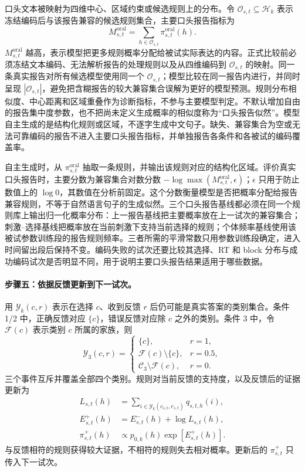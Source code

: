 口头文本被映射为四维中心、区域约束或候选规则上的分布。令 $\mathcal O_{s,t}\subseteq\mathcal H_k$ 表示冻结编码后与该报告兼容的候选规则集合，主要口头报告指标为
\begin{equation}
    M^{\mathrm{oral}}_{s,t}
    =\sum_{h\in\mathcal O_{s,t}}\pi^{\mathrm{oral}}_{s,t}(h).
    \label{eq:newplan-oral-mass}
\end{equation}
$M^{\mathrm{oral}}_{s,t}$ 越高，表示模型把更多规则概率分配给被试实际表达的内容。正式比较前必须冻结文本编码、无法解析报告的处理规则以及从四维编码到 $\mathcal O_{s,t}$ 的映射。同一条真实报告对所有候选模型使用同一个 $\mathcal O_{s,t}$；模型比较在同一报告内进行，并同时呈现 $|\mathcal O_{s,t}|$，避免把含糊报告的较大兼容集合误解为更好的模型预测。规则分布相似度、中心距离和区域重叠作为诊断指标，不参与主要模型判定。不默认增加自由的报告集中度参数，也不把尚未定义生成概率的相似度称为“口头报告似然”。模型自主生成的是结构化规则或区域，不逐字生成中文句子。缺失、兼容集合为空或无法可靠编码的报告不进入主要口头报告指标，并单独报告各条件和各被试的编码覆盖率。

自主生成时，从 $\pi^{\mathrm{oral}}_{s,t}$ 抽取一条规则，并输出该规则对应的结构化区域。评价真实口头报告时，主要分数为兼容集合对数分数 $-\log\max(M^{\mathrm{oral}}_{s,t},\epsilon)$；$\epsilon$ 只用于防止数值上的 $\log 0$，其数值在分析前固定。这个分数衡量模型是否把概率分配给报告兼容规则，不等于自然语言句子的生成似然。三个口头报告基线都必须在同一个规则库上输出归一化概率分布：上一报告基线把主要概率放在上一试次的兼容集合；刺激--选择基线把概率放在当前刺激下支持当前选择的规则；个体频率基线使用该被试参数训练段的报告规则频率。三者所需的平滑常数只用参数训练段确定，进入时间留出段后保持不变。编码失败的试次还要比较其选择、RT 和 block 分布与成功编码试次是否明显不同，用于说明主要口头报告结果适用于哪些数据。

\paragraph{步骤五：依据反馈更新到下一试次。}
用 $\mathcal Y_k(c,r)$ 表示在选择 $c$、收到反馈 $r$ 后仍可能是真实答案的类别集合。条件 1/2 中，正确反馈对应 $\{c\}$，错误反馈对应除 $c$ 之外的类别。条件 3 中，令 $\mathcal F(c)$ 表示类别 $c$ 所属的家族，则
\begin{equation}
    \mathcal Y_3(c,r)=
    \begin{cases}
        \{c\},&r=1,\\
        \mathcal F(c)\setminus\{c\},&r=0.5,\\
        \mathcal C_3\setminus\mathcal F(c),&r=0.
    \end{cases}
    \label{eq:newplan-feedback-graded}
\end{equation}
三个事件互斥并覆盖全部四个类别。规则对当前反馈的支持度，以及反馈后的证据更新为
\begin{align}
    L_{s,t}(h)
      &=\sum_{i\in\mathcal Y_k(c_{s,t},r_{s,t})}q_{s,t,h}(i),\\
    E^+_{s,t}(h)&=E^-_{s,t}(h)+\log L_{s,t}(h),\\
    \pi^+_{s,t}(h)&\propto p_{0,k}(h)\exp[E^+_{s,t}(h)].
    \label{eq:newplan-feedback-update}
\end{align}
与反馈相符的规则获得较大证据，不相符的规则失去相对概率。更新后的 $\pi^+_{s,t}$ 只传入下一试次。

